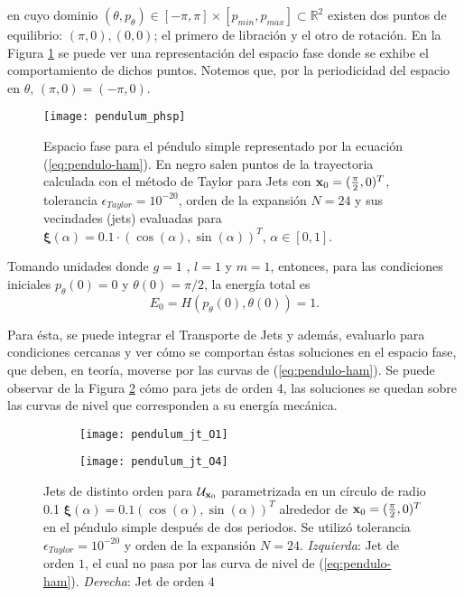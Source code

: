 en cuyo dominio $(\theta,p_{\theta}) \in [-\pi,\pi]\times[p_{min},p_{max}] \subset \mathbb{R}^2$ existen dos puntos de equilibrio: $(\pi,0), (0,0)$; el primero de libración y el otro de rotación. En la Figura \ref{fig:pendulum_pshp} se puede ver una representación del espacio fase donde se exhibe el comportamiento de dichos puntos. Notemos que, por la periodicidad del espacio en $\theta$, $(\pi, 0) = (-\pi, 0)$.

\begin{figure}[h!]
 \centering
 \texttt{[image: pendulum\_phsp]}
 \caption{Espacio fase para el péndulo simple representado por la ecuación (\ref{eq:pendulo-ham}). En negro salen puntos de la trayectoria calculada con el método de Taylor para Jets con $\mathbf{x}_0 = (\frac{\pi}{2},0)^T$, tolerancia $\epsilon_{Taylor} = 10^{-20}$, orden de la expansión $N = 24$ y sus vecindades (jets) evaluadas para $\mathbf{\xi}(\alpha) = 0.1\cdot \left( \cos(\alpha), \sin(\alpha) \right)^T$, $\alpha \in [0,1]$.}
\label{fig:pendulum_pshp}
\end{figure}

Tomando unidades donde $g = 1 $ , $l=1$ y $m=1$,  entonces, para las condiciones iniciales $p_{\theta}(0) = 0 $ y $\theta(0) = \pi/2$, la energía total es 
\begin{equation*}
E_0 = H(p_{\theta}(0),\theta (0) ) = 1.
\end{equation*}

Para ésta, se puede integrar el Transporte de Jets y además, evaluarlo para condiciones cercanas y ver cómo se comportan éstas soluciones en el espacio fase, que deben, en teoría, moverse por las curvas de (\ref{eq:pendulo-ham}). Se puede observar de la Figura \ref{fig:pendulum_jt} cómo para jets de orden 4, las soluciones se quedan sobre las curvas de nivel que corresponden a su energía mecánica.

\begin{figure}[h!]
\centering
\begin{subfigure}{0.49\textwidth}
	\centering
	\texttt{[image: pendulum\_jt\_O1]}
\end{subfigure}
%
\begin{subfigure}{0.49\textwidth}
	\centering
	\texttt{[image: pendulum\_jt\_O4]}
\end{subfigure}
\caption{Jets de distinto orden para $\mathcal{U}_{\mathbf{x}_0}$ parametrizada en un círculo de radio 0.1 $\mathbf{\xi}(\alpha) = 0.1\left( \cos(\alpha),\sin(\alpha) \right)^T$ alrededor de $\mathbf{x}_0 = (\frac{\pi}{2},0)^T$ en el péndulo simple después de dos periodos. Se utilizó tolerancia $\epsilon_{Taylor} = 10^{-20}$ y orden de la expansión $N = 24$. \textit{Izquierda}: Jet de orden $1$, el cual no pasa por las curva de nivel de (\ref{eq:pendulo-ham}). \textit{Derecha}: Jet de orden $4$}
\label{fig:pendulum_jt}
\end{figure}

